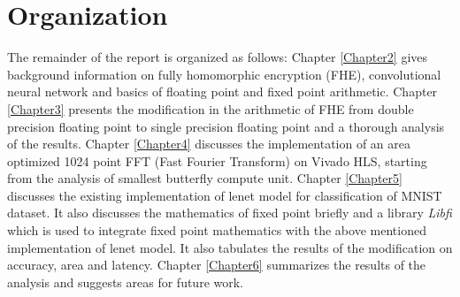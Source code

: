 \section{Organization}

The remainder of the report is organized as follows:
Chapter \ref{Chapter2} gives background information on fully homomorphic encryption (FHE), convolutional neural network and basics of floating point and fixed point arithmetic.
Chapter \ref{Chapter3} presents the modification in the arithmetic of FHE from double precision floating point to single precision floating point and a thorough analysis of the results.
Chapter \ref{Chapter4} discusses the implementation of an area optimized 1024 point FFT (Fast Fourier Transform) on Vivado HLS, starting from the analysis of smallest butterfly compute unit.
Chapter \ref{Chapter5} discusses the existing implementation of lenet model for classification of MNIST dataset. It also discusses the mathematics of fixed point briefly and a library \textit{Libfi} which is used to integrate fixed point mathematics with the above mentioned implementation of lenet model. It also tabulates the results of the modification on accuracy, area and latency.  
Chapter \ref{Chapter6} summarizes the results of the analysis and suggests areas for future work.







